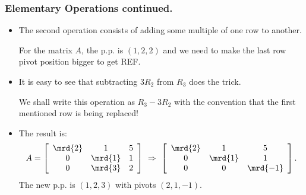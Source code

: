 \begin{frame}%
  \frametitle{Elementary Operations continued.}
  \begin{itemize}%
 
\item The second operation consists of adding some multiple of one row
to another.

For the matrix $A$, the p.p. is $(1,2,2)$ and we need to make the last
row pivot position bigger to get REF.

\item It is easy to see that subtracting $3R_2$ from $R_3$ does the trick.

We shall write this operation as $R_3-3R_2$ with the convention that the
first mentioned row is being replaced!

\item The result is:
$$A= \left[
 \begin{array}{ccc}
 \mrd{2} & 1 & 5 \\
 0 & \mrd{1} & 1 \\
 0 & \mrd{3} & 2\\
 \end{array}\right]
 ~\Rightarrow ~
 \left[
 \begin{array}{ccc}
 \mrd{2} & 1 & 5 \\
 0 & \mrd{1} & 1 \\
 0 & 0 & \mrd{-1}\\
 \end{array}\right].
$$
The new p.p. is $(1,2,3)$ with pivots $(2,1,-1)$.


\end{itemize}
\end{frame}


